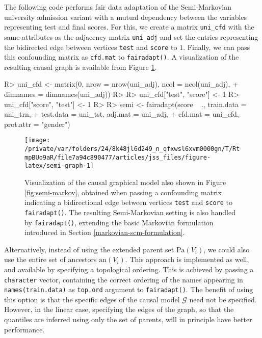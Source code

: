 \documentclass[
  nojss]{jss}
\begin{document}
The following code performs fair data adaptation of the Semi-Markovian
university admission variant with a mutual dependency between the
variables representing test and final scores. For this, we create a
matrix \texttt{uni\_cfd} with the same attributes as the adjacency
matrix \texttt{uni\_adj} and set the entries representing the bidirected
edge between vertices \texttt{test} and \texttt{score} to \(1\).
Finally, we can pass this confounding matrix as \texttt{cfd.mat} to
\texttt{fairadapt()}. A visualization of the resulting causal graph is
available from Figure \ref{fig:semi-graph}.

\begin{CodeChunk}
\begin{CodeInput}
R> uni_cfd <- matrix(0, nrow = nrow(uni_adj), ncol = ncol(uni_adj),
+                   dimnames = dimnames(uni_adj))
R> 
R> uni_cfd["test", "score"] <- 1
R> uni_cfd["score", "test"] <- 1
R> 
R> semi <- fairadapt(score ~ ., train.data = uni_trn,
+                   test.data = uni_tst, adj.mat = uni_adj,
+                   cfd.mat = uni_cfd, prot.attr = "gender")
\end{CodeInput}
\end{CodeChunk}

\begin{CodeChunk}
\begin{figure}

{\centering \texttt{[image: /private/var/folders/24/8k48jl6d249\_n\_qfxwsl6xvm0000gn/T/RtmpBUo9aR/file7a94c890477/articles/jss\_files/figure-latex/semi-graph-1]} 

}

\caption{Visualization of the causal graphical model also shown in Figure \ref{fig:semi-markov}, obtained when passing a confounding matrix indicating a bidirectional edge between vertices \texttt{test} and \texttt{score} to \texttt{fairadapt()}. The resulting Semi-Markovian setting is also handled by \texttt{fairadapt()}, extending the basic Markovian formulation introduced in Section \ref{markovian-scm-formulation}.}\label{fig:semi-graph}
\end{figure}
\end{CodeChunk}

Alternatively, instead of using the extended parent set
\(\mathrm{Pa}(V_i)\), we could also use the entire set of ancestors
\(\mathrm{an}(V_i)\). This approach is implemented as well, and
available by specifying a topological ordering. This is achieved by
passing a \texttt{character} vector, containing the correct ordering of
the names appearing in \texttt{names(train.data)} as \texttt{top.ord}
argument to \texttt{fairadapt()}. The benefit of using this option is
that the specific edges of the causal model \(\mathcal{G}\) need not be
specified. However, in the linear case, specifying the edges of the
graph, so that the quantiles are inferred using only the set of parents,
will in principle have better performance.
\end{document}
